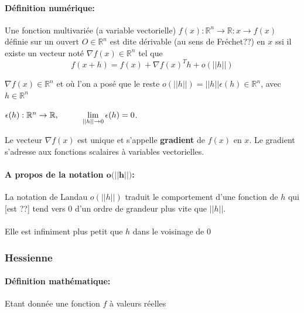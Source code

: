		\paragraph*{Définition numérique:}
		Une fonction multivariée (a variable vectorielle)
		$ f(x)	: \mathbb{R}^n \rightarrow \mathbb{R} : x \rightarrow f(x) $ définie sur un ouvert $O \in \mathbb{R}^n$ est dite dérivable (au sens de Fréchet??) en $x$ ssi il existe un vecteur noté $\nabla f(x) \in \mathbb{R}^n$ tel que
		\begin{equation}
			f(x+h) = f(x) + \nabla f(x)^{T}h + o(||h||)
		\end{equation}
		
		$\nabla f(x) \in \mathbb{R}^n$ et où l’on a posé que le reste $o(||h||) = ||h||\epsilon (h) \in \mathbb{R}^n$, avec $h \in \mathbb{R}^n$ 
		\begin{center}
			$\epsilon (h): \mathbb{R}^n\rightarrow \mathbb{R}, \hspace{1 cm} \lim\limits_{||h|| \rightarrow 0} \epsilon(h)=0$.
		\end{center} 
		Le vecteur $\nabla f(x)$ est unique et s’appelle \textbf{gradient} de $f(x)$ en $x$.
		Le gradient s’adresse aux fonctions scalaires à variables vectorielles.
		\paragraph*{A propos de la notation $\textbf{o(||h||)}$:}
		La notation de Landau $o(||h||)$ traduit le comportement d’une fonction de $h$ qui [est ??] tend vers $0$ d’un ordre de grandeur plus vite que $||h||$.\\\\
		Elle est infiniment plus petit que $h$ dans le voisinage de $0$
		
		
		
			
	\subsubsection{Hessienne}
	\paragraph*{Définition mathématique:}
	Etant donnée une fonction ${f}$ à valeurs réelles
	
